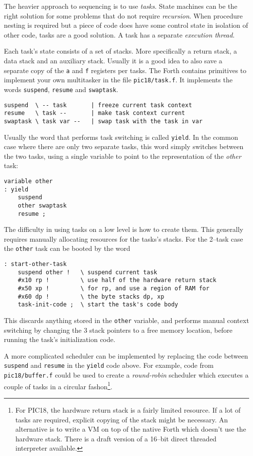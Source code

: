\documentclass[12pt]{article}
\begin{document}
The heavier approach to sequencing is to use \emph{tasks}. State
machines can be the right solution for some problems that do not
require \emph{recursion}. When procedure nesting is required but a
piece of code does have some control state in isolation of other code,
tasks are a good solution. A task has a separate \emph{execution
  thread}.

Each task's state consists of a set of stacks. More specifically a
return stack, a data stack and an auxiliary stack. Usually it is a
good idea to also save a separate copy of the \verb|a| and \verb|f|
registers per tasks. The Forth contains primitives to implement your
own multitasker in the file \verb|pic18/task.f|. It implements the
words \verb|suspend|, \verb|resume| and \verb|swaptask|.
\begin{verbatim}
suspend  \ -- task       | freeze current task context
resume   \ task --       | make task context current
swaptask \ task var --   | swap task with the task in var
\end{verbatim}

Usually the word that performs task switching is called
\verb|yield|. In the common case where there are only two separate
tasks, this word simply switches between the two tasks, using a single
variable to point to the representation of the \emph{other} task:
\begin{verbatim}
variable other
: yield
    suspend
    other swaptask
    resume ;
\end{verbatim}
The difficulty in using tasks on a low level is how to create
them. This generally requires manually allocating resources for the
tasks's stacks. For the 2--task case the \verb|other| task can be
booted by the word
\begin{verbatim}
: start-other-task
    suspend other !   \ suspend current task
    #x10 rp !         \ use half of the hardware return stack 
    #x50 xp !         \ for rp, and use a region of RAM for 
    #x60 dp !         \ the byte stacks dp, xp
    task-init-code ;  \ start the task's code body
\end{verbatim}
This discards anything stored in the \verb|other| variable, and
performs manual context switching by changing the 3 stack pointers to
a free memory location, before running the task's initialization code.

A more complicated scheduler can be implemented by replacing the code
between \verb|suspend| and \verb|resume| in the \verb|yield| code
above. For example, code from \verb|pic18/buffer.f| could be used to
create a \emph{round-robin} scheduler which executes a couple of tasks
in a circular fashon\footnote{For PIC18, the hardware return stack is
  a fairly limited resource. If a lot of tasks are required, explicit
  copying of the stack might be necessary. An alternative is to write
  a VM on top of the native Forth which doesn't use the hardware
  stack. There is a draft version of a 16--bit direct threaded
  interpreter available.}.
\end{document}
